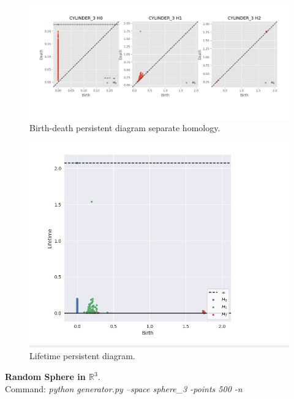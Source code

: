 \documentclass[11pt,a4paper]{report}
\begin{document}
              \begin{figure}[H]
                \centering
                \includegraphics[width=\linewidth]{./ripser/on_cylinder_pers_homology_sep.jpg}
                \caption{Birth-death persistent diagram separate homology.}
                \label{fig:sep hom}
              \end{figure}

              \begin{figure}[H]
                \centering
                \includegraphics[width=0.5\linewidth, scale=0.5]{./ripser/on_cylinder_lifetime.jpg}
                \caption{Lifetime persistent diagram.}
                \label{fig:sep hom}
              \end{figure}

              \textbf{Random Sphere in $\mathbb{R}^3$}.\\
              Command: \textit{python generator.py --space sphere\_3 -points 500 -n}
\end{document}
